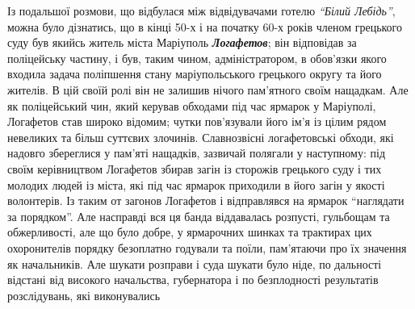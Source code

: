 \documentclass[a4paper,20pt]{report}
\begin{document}
Із подальшої розмови, що відбулася між відвідувачами готелю \emph{``Білий Лебідь''}, можна було
дізнатись, що в кінці 50-х і на початку 60-х років членом грецького суду був якийсь
житель міста Маріуполь \textbf{\em Логафетов}; він відповідав за поліцейську частину, і був,
таким чином, адміністратором, в обов'язки якого входила задача поліпшення стану маріупольського
грецького округу та його жителів.
В цій своїй ролі він не залишив нічого пам'ятного своїм нащадкам. Але як поліцейський чин,
який керував обходами під час ярмарок у Маріуполі, Логафетов став широко відомим; 
чутки пов'язували його ім'я із цілим рядом невеликих та більш суттєвих злочинів.
Славнозвісні логафетовські обходи, які надовго збереглися у пам'яті нащадків, зазвичай полягали
у наступному: під своїм керівництвом Логафетов збирав загін із сторожів грецького суду і тих молодих
людей із міста, які під час ярмарок приходили в його загін у якості волонтерів. Із таким от загонов 
Логафетов і відправлявся на ярмарок ``наглядати за порядком''. Але насправді вся ця банда віддавалась
розпусті, гульбощам та обжерливості, але що було добре, у ярмарочних шинках та трактирах цих охоронителів
порядку безоплатно годували та поїли, пам'ятаючи про
їх значення як начальників. Але шукати розправи і суда шукати було ніде, по дальності відстані
від високого начальства, губернатора і по безплодності результатів розслідувань, які виконувались
\end{document}
